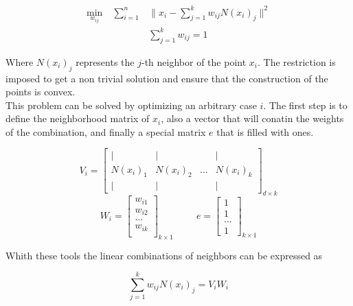 \documentclass[12pt,journal]{IEEEtran}
\begin{document}
    \begin{equation*}
        \begin{aligned}
            \underset{w_{ij}}{\text{min}} \quad \sum_{i=1}^n & \lVert x_i - \sum_{j=1}^k w_{ij} N(x_i)_j \rVert^2 \\
            & \sum_{j=1}^k w_{ij} = 1
        \end{aligned}
    \end{equation*}

    Where $N(x_i)_j$ represents the $j$-th neighbor of the point $x_i$. The
    restriction is imposed to get a non trivial solution and ensure that
    the construction of the points is convex.\\

    This problem can be solved by optimizing an arbitrary case $i$. The first
    step is to define the neighborhood matrix of $x_i$, also a vector that will
    conatin the weights of the combination, and finally a special matrix $e$ that
    is filled with ones.

    \[
        V_i =
        \begin{bmatrix}
            |      &  |     &       & | \\
            N(x_i)_1 & N(x_i)_2 & \dots & N(x_i)_k \\
            |      &  |     &       & |
        \end{bmatrix}_{d \times k}
    \]
    \[
        W_i =
        \begin{bmatrix}
            w_{i1}\\
            w_{i2}\\
            \dots \\
            w_{ik}\\
        \end{bmatrix}_{k \times 1}
        \hspace{1cm}
        e =
        \begin{bmatrix}
        1\\
        1\\
        \dots\\
        1
        \end{bmatrix}_{k \times 1}
    \]

    Whith these tools the linear combinations of neighbors can be expressed as

    \begin{equation*}
        \sum_{j=1}^k w_{ij} N(x_i)_j = V_i W_i
    \end{equation*}
\end{document}
